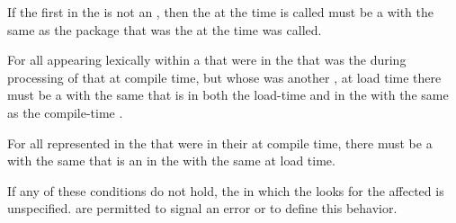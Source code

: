  If the first   in the 
	  is not an  , then the 
	  at the time  is called must be a  with the 
	  same  as the package that was the 
	  at the time  was called.
\endlist

 For all  
      appearing lexically within a  that
      were  in the  that was the 
      during processing of that  at compile time, but
      whose  was another , at load time there must
      be a  with the same  that is  in both the
      load-time  and in the 
      with the same  as the
      compile-time . 
  
 For all  represented in the  
      that were  in
      their  at compile time, there must be a  with the
      same  that is an  in the  
      with the same  at load time.
\endlist
        
  If any of these conditions do not hold, the  in which the  looks
  for the affected  is unspecified.   are permitted 
  to signal an error or to define this behavior.

\endlist

\endsubsubsection%

\endsubSection%



